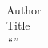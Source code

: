 \begin{titlingpage}
    \centering
    \textbf{\Large \theinstitution{}}\\
    {\large 
    \thelaboratory{}
    \vfill
    Author\\
    \theauthor{}
    \vfill
    Title \\
    \emph{``\thetitle''}
    }
    \vfill
\end{titlingpage}
\clearpage
